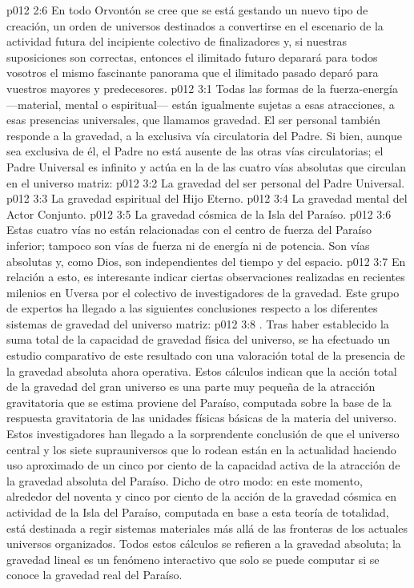 \vs p012 2:6 En todo Orvontón se cree que se está gestando un nuevo tipo de creación, un orden de universos destinados a convertirse en el escenario de la actividad futura del incipiente colectivo de finalizadores y, si nuestras suposiciones son correctas, entonces el ilimitado futuro deparará para todos vosotros el mismo fascinante panorama que el ilimitado pasado deparó para vuestros mayores y predecesores.
\vs p012 3:1 Todas las formas de la fuerza\hyp{}energía ---material, mental o espiritual--- están igualmente sujetas a esas atracciones, a esas presencias universales, que llamamos gravedad. El ser personal también responde a la gravedad, a la exclusiva vía circulatoria del Padre. Si bien, aunque sea exclusiva de él, el Padre no está ausente de las otras vías circulatorias; el Padre Universal es infinito y actúa en la  de las cuatro vías absolutas que circulan en el universo matriz:
\vs p012 3:2 La gravedad del ser personal del Padre Universal.
\vs p012 3:3 La gravedad espiritual del Hijo Eterno.
\vs p012 3:4 La gravedad mental del Actor Conjunto.
\vs p012 3:5 La gravedad cósmica de la Isla del Paraíso.
\vs p012 3:6 \pc Estas cuatro vías no están relacionadas con el centro de fuerza del Paraíso inferior; tampoco son vías de fuerza ni de energía ni de potencia. Son vías  absolutas y, como Dios, son independientes del tiempo y del espacio.
\vs p012 3:7 En relación a esto, es interesante indicar ciertas observaciones realizadas en recientes milenios en Uversa por el colectivo de investigadores de la gravedad. Este grupo de expertos ha llegado a las siguientes conclusiones respecto a los diferentes sistemas de gravedad del universo matriz:
\vs p012 3:8 . Tras haber establecido la suma total de la capacidad de gravedad física del universo, se ha efectuado un estudio comparativo de este resultado con una valoración total de la presencia de la gravedad absoluta ahora operativa. Estos cálculos indican que la acción total de la gravedad del gran universo es una parte muy pequeña de la atracción gravitatoria que se estima proviene del Paraíso, computada sobre la base de la respuesta gravitatoria de las unidades físicas básicas de la materia del universo. Estos investigadores han llegado a la sorprendente conclusión de que el universo central y los siete suprauniversos que lo rodean están en la actualidad haciendo uso aproximado de un cinco por ciento de la capacidad activa de la atracción de la gravedad absoluta del Paraíso. Dicho de otro modo: en este momento, alrededor del noventa y cinco por ciento de la acción de la gravedad cósmica en actividad de la Isla del Paraíso, computada en base a esta teoría de totalidad, está destinada a regir sistemas materiales más allá de las fronteras de los actuales universos organizados. Todos estos cálculos se refieren a la gravedad absoluta; la gravedad lineal es un fenómeno interactivo que solo se puede computar si se conoce la gravedad real del Paraíso.
